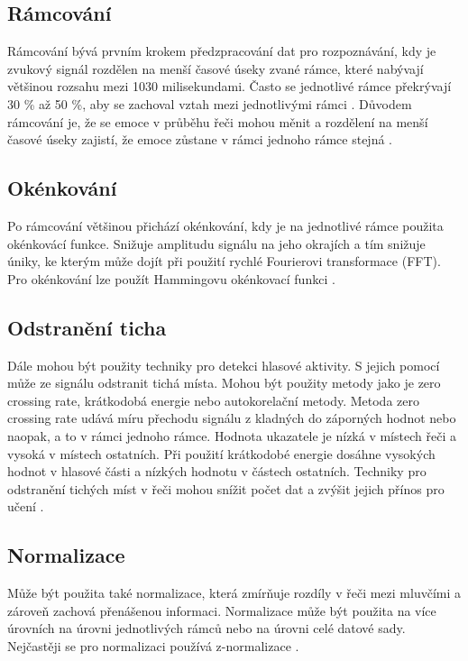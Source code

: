 \documentclass[FM,BP]{tulthesis}
\begin{document}
\subsection{Rámcování} %
Rámcování bývá prvním krokem předzpracování dat pro rozpoznávání, kdy je zvukový signál rozdělen na menší časové úseky zvané rámce, které nabývají většinou rozsahu mezi 10\text{--}30 milisekundami. Často se jednotlivé rámce překrývají 30 \% až 50 \%, aby se zachoval vztah mezi jednotlivými rámci \cite{DBLP:journals/speech/AkcayO20}. Důvodem rámcování je, že se emoce v průběhu řeči mohou měnit a rozdělení na menší časové úseky zajistí, že emoce zůstane v rámci jednoho rámce stejná \cite{konar_chakraborty_2015}.

\subsection{Okénkování} %
Po rámcování většinou přichází okénkování, kdy je na jednotlivé rámce použita okénkovácí funkce. Snižuje amplitudu signálu na jeho okrajích a tím snižuje úniky, ke kterým může dojít při použití rychlé Fourierovi transformace (FFT). Pro okénkování lze použít Hammingovu okénkovací funkci \cite{DBLP:journals/speech/AkcayO20}.

\subsection{Odstranění ticha} %
Dále mohou být použity techniky pro detekci hlasové aktivity. S jejich pomocí může ze signálu odstranit tichá místa. Mohou být použity metody jako je zero crossing rate, krátkodobá energie nebo autokorelační metody. Metoda zero crossing rate udává míru přechodu signálu z kladných do záporných hodnot nebo naopak, a to v rámci jednoho rámce. Hodnota ukazatele je nízká v místech řeči a vysoká v místech ostatních. Při použití krátkodobé energie dosáhne vysokých hodnot v hlasové části a nízkých hodnotu v částech ostatních. Techniky pro odstranění tichých míst v řeči mohou snížit počet dat a zvýšit jejich přínos pro učení \cite{DBLP:journals/speech/AkcayO20}.

\subsection{Normalizace} %
Může být použita také normalizace, která zmírňuje rozdíly v řeči mezi mluvčími a zároveň zachová přenášenou informaci. Normalizace může být použita na více úrovních na úrovni jednotlivých rámců nebo na úrovni celé datové sady. Nejčastěji se pro normalizaci používá z-normalizace \cite{DBLP:journals/speech/AkcayO20}.
\end{document}
